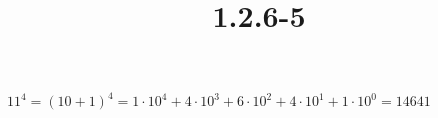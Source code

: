 \documentclass{article}
\title{1.2.6-5}
\begin{document}
\maketitle

\( 11^4 = (10+1)^4 = 1 \cdot 10^4 + 4 \cdot 10^3 + 6 \cdot 10^2 + 4 \cdot 10^1 + 1 \cdot 10^0 = 14641 \)
\end{document}
